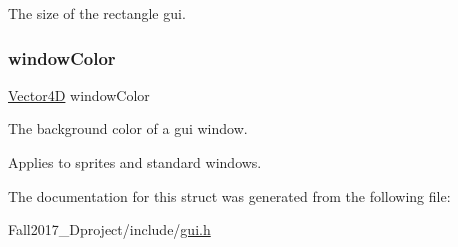 The size of the rectangle gui. 

\mbox{\label{structguiwindow__s_a51801116a41ba4f4c50852a351bb44c6}} 
\subsubsection{\texorpdfstring{window\+Color}{windowColor}}
{\footnotesize\ttfamily \hyperlink{struct_vector4_d}{Vector4D} window\+Color}



The background color of a gui window. 

Applies to sprites and standard windows. 

The documentation for this struct was generated from the following file\+:\begin{DoxyCompactItemize}
\item 
Fall2017\+\_\+Dproject/include/\hyperlink{gui_8h}{gui.\+h}\end{DoxyCompactItemize}
